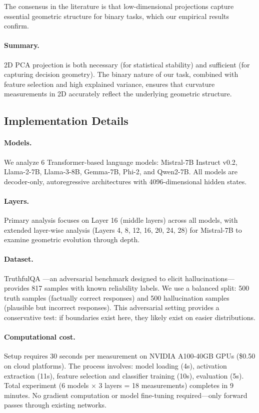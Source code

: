 \documentclass[11pt]{article}
\begin{document}
The consensus in the literature is that low-dimensional projections capture essential geometric structure for binary tasks, which our empirical results confirm.

\paragraph{Summary.}
2D PCA projection is both necessary (for statistical stability) and sufficient (for capturing decision geometry). The binary nature of our task, combined with feature selection and high explained variance, ensures that curvature measurements in 2D accurately reflect the underlying geometric structure.

\subsection{Implementation Details}

\paragraph{Models.} We analyze 6 Transformer-based language models: Mistral-7B Instruct v0.2, Llama-2-7B, Llama-3-8B, Gemma-7B, Phi-2, and Qwen2-7B. All models are decoder-only, autoregressive architectures with 4096-dimensional hidden states.

\paragraph{Layers.} Primary analysis focuses on Layer 16 (middle layers) across all models, with extended layer-wise analysis (Layers 4, 8, 12, 16, 20, 24, 28) for Mistral-7B to examine geometric evolution through depth.

\paragraph{Dataset.} TruthfulQA \citep{lin2022truthfulqa}---an adversarial benchmark designed to elicit hallucinations---provides 817 samples with known reliability labels. We use a balanced split: 500 truth samples (factually correct responses) and 500 hallucination samples (plausible but incorrect responses). This adversarial setting provides a conservative test: if boundaries exist here, they likely exist on easier distributions.

\paragraph{Computational cost.} Setup requires 30 seconds per measurement on NVIDIA A100-40GB GPUs (\$0.50 on cloud platforms). The process involves: model loading (4s), activation extraction (11s), feature selection and classifier training (10s), evaluation (5s). Total experiment (6 models $\times$ 3 layers = 18 measurements) completes in 9 minutes. No gradient computation or model fine-tuning required---only forward passes through existing networks.
\end{document}
